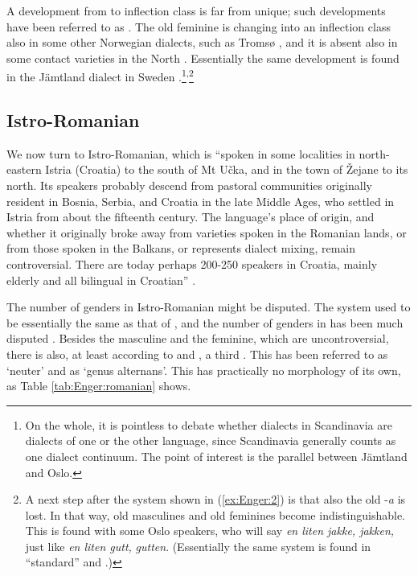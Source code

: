 \documentclass[output=paper]{langsci/langscibook}
\begin{document}
A development from  to inflection class is far from unique; such
developments have been referred to as  %
\citep[cf.][]{Lehmann82,Lehmann16,Wurzel86}%
%
. The old feminine is changing into an
inflection class also in some other Norwegian dialects, such as Tromsø %
\citep{Westergaard15,Westergaard16}%
%
, and it is absent also in some
contact varieties in the North %
\citep{Conzett11}%
%
.
Essentially the same development is found in the Jämtland dialect in
Sweden %
\citep{VanEpps17}%
%
.\footnote{On the whole, it is
  pointless to debate whether dialects in Scandinavia are dialects of
  one or the other language, since Scandinavia generally counts as one
  dialect continuum. The point of interest is the parallel between
  Jämtland and Oslo.}\textsuperscript{,}\footnote{A next step after the
  system shown in (\ref{ex:Enger:2}) is that also the old -\emph{a}  is lost. In
  that way, old masculines and old feminines become indistinguishable.
  This is found with some Oslo speakers, who will say \emph{en liten
  jakke, jakken,} just like \emph{en liten gutt,} \emph{gutten}.
  (Essentially the same system is found in ``standard''  and
  .)}

\subsection{Istro-Romanian}

We now turn to Istro-Romanian, which is ``spoken in some localities in
north-eastern Istria (Croatia) to the south of Mt Učka, and in the town
of Žejane to its north. Its speakers probably descend from pastoral
communities originally resident in Bosnia, Serbia, and Croatia in the
late Middle Ages, who settled in Istria from about the fifteenth
century. The language's place of origin, and whether it originally broke
away from varieties spoken in the Romanian lands, or from those spoken
in the Balkans, or represents dialect mixing, remain controversial.
There are today perhaps 200-250 speakers in Croatia, mainly elderly and
all bilingual in Croatian'' %
\citep[91]{Maiden16}%
%
.

The number of genders in Istro-Romanian might be disputed. The system
used to be essentially the same as that of , and the number of
genders in  has been much disputed %
\citep[cf.][]{Corbett1991,Maiden16b,Maiden16c,Loporcaro16}%
%
. Besides the masculine and the feminine, which
are uncontroversial, there is also, at least according to %
\citet{Corbett1991} %
%
and %
\citet{Loporcaro16}%
%
, a third . This  has been referred to
as `neuter' and as `genus alternans'. This  has practically no
morphology of its own, as Table \ref{tab:Enger:romanian} shows.
\end{document}
